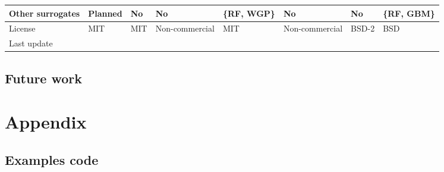 \documentclass[10pt,a4paper,twoside]{book}
\begin{document}
\begin{table}[]
\begin{tabular}{@{}llllllll@{}}
		Other surrogates                   & Planned                             & No                                            & No                      & \{RF, WGP\}                & No                            & No                        & \{RF, GBM\}                         \\ \midrule
		License                            & MIT                                 & MIT                                           & Non-commercial          & MIT                        & Non-commercial                & BSD-2                     & BSD                                 \\ \midrule
		Last update                        &                                     &                                               &                         &                            &                               &                           &                                    
	\end{tabular}
\end{table}


\section{Future work}

\chapter*{Appendix}
\section*{Examples code}
\end{document}
